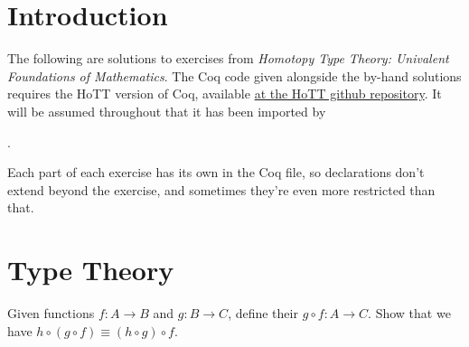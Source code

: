 \begin{coqdoccode}
\end{coqdoccode}


\section*{Introduction}


The following are solutions to exercises from
\textit{Homotopy Type Theory: Univalent Foundations of Mathematics}.  The Coq
code given alongside the by-hand solutions requires the HoTT version of Coq,
available \href{https://github.com/HoTT}{at the HoTT github repository}.  It
will be assumed throughout that it has been imported by \begin{coqdoccode}
\coqdocemptyline
\coqdocnoindent
{}  .\coqdoceol
\coqdocemptyline
\end{coqdoccode}
\noindent
Each part of each exercise has its own  in the Coq file, so 
declarations don't extend beyond the exercise, and sometimes they're even more
restricted than that.


\section{Type Theory}

\begin{coqdoccode}
\coqdocemptyline
\end{coqdoccode}
Given functions $f:A\to B$ and $g:B\to C$, define their  
$g \circ f : A \to C$.  Show that we have $h \circ (g \circ f) \equiv (h \circ g) \circ f$.


